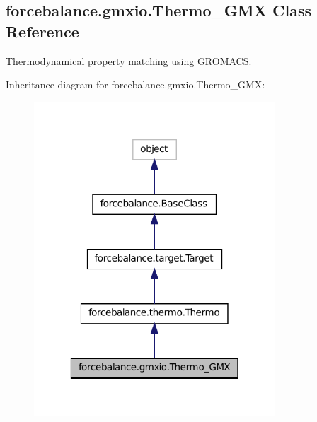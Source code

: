 \hypertarget{classforcebalance_1_1gmxio_1_1Thermo__GMX}{\subsection{forcebalance.\-gmxio.\-Thermo\-\_\-\-G\-M\-X Class Reference}
\label{classforcebalance_1_1gmxio_1_1Thermo__GMX}
}


Thermodynamical property matching using G\-R\-O\-M\-A\-C\-S.  




Inheritance diagram for forcebalance.\-gmxio.\-Thermo\-\_\-\-G\-M\-X\-:
\nopagebreak
\begin{figure}[H]
\begin{center}
\leavevmode
\includegraphics[width=256pt]{classforcebalance_1_1gmxio_1_1Thermo__GMX__inherit__graph}
\end{center}
\end{figure}



